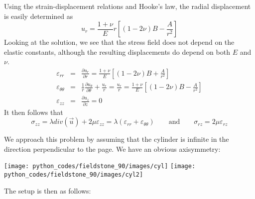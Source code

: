 Using the strain-displacement relations and Hooke's law, the radial
displacement is easily determined as
\[
u_r = \frac{1+\nu}{E}r \left[ (1-2\nu) B - \frac{A}{r^2}\right]
\]
Looking at the solution, we see that 
the stress field does not depend on the elastic constants, although the
resulting displacements do depend on both $E$ and $\nu$.
\begin{eqnarray}
\varepsilon_{rr} &=& \frac{\partial u_r}{\partial r} = 
\frac{1+\nu}{E} \left[ (1-2\nu) B + \frac{A}{r^2}\right]
\\
\varepsilon_{\theta\theta} &=& \frac1r \frac{\partial u_\theta}{\partial \theta} + \frac{u_r}{r} 
=\frac{u_r}{r}  
=\frac{1+\nu}{E} \left[ (1-2\nu) B - \frac{A}{r^2}\right] 
\\
\varepsilon_{zz} &=& \frac{\partial u_z}{\partial z} = 0 
\end{eqnarray}
It then follows that 
\[
\sigma_{zz} = \lambda div(\vec{u}) + 2 \mu \varepsilon_{zz} = \lambda (\varepsilon_{rr} + \varepsilon_{\theta\theta})
\qquad
\text{and}
\qquad
\sigma_{rz} = 2 \mu \varepsilon_{rz} 
\]

We approach this problem by assuming that the cylinder is infinite in the direction perpendicular 
to the page. We have an obvious axisymmetry: 

\begin{center}
\texttt{[image: python\_codes/fieldstone\_90/images/cyl]}
\texttt{[image: python\_codes/fieldstone\_90/images/cyl2]}\\
\end{center}

The setup is then as follows:

\begin{center}
\end{center}


